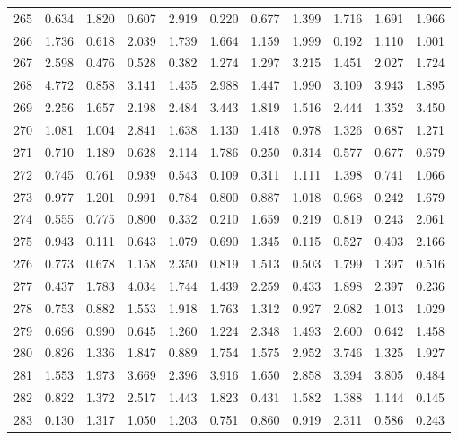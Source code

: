 \begin{tabular}{lrrrrrrrrrr}
265 &  0.634 &  1.820 &  0.607 &  2.919 &  0.220 &  0.677 &  1.399 &  1.716 &  1.691 &  1.966 \\
266 &  1.736 &  0.618 &  2.039 &  1.739 &  1.664 &  1.159 &  1.999 &  0.192 &  1.110 &  1.001 \\
267 &  2.598 &  0.476 &  0.528 &  0.382 &  1.274 &  1.297 &  3.215 &  1.451 &  2.027 &  1.724 \\
268 &  4.772 &  0.858 &  3.141 &  1.435 &  2.988 &  1.447 &  1.990 &  3.109 &  3.943 &  1.895 \\
269 &  2.256 &  1.657 &  2.198 &  2.484 &  3.443 &  1.819 &  1.516 &  2.444 &  1.352 &  3.450 \\
270 &  1.081 &  1.004 &  2.841 &  1.638 &  1.130 &  1.418 &  0.978 &  1.326 &  0.687 &  1.271 \\
271 &  0.710 &  1.189 &  0.628 &  2.114 &  1.786 &  0.250 &  0.314 &  0.577 &  0.677 &  0.679 \\
272 &  0.745 &  0.761 &  0.939 &  0.543 &  0.109 &  0.311 &  1.111 &  1.398 &  0.741 &  1.066 \\
273 &  0.977 &  1.201 &  0.991 &  0.784 &  0.800 &  0.887 &  1.018 &  0.968 &  0.242 &  1.679 \\
274 &  0.555 &  0.775 &  0.800 &  0.332 &  0.210 &  1.659 &  0.219 &  0.819 &  0.243 &  2.061 \\
275 &  0.943 &  0.111 &  0.643 &  1.079 &  0.690 &  1.345 &  0.115 &  0.527 &  0.403 &  2.166 \\
276 &  0.773 &  0.678 &  1.158 &  2.350 &  0.819 &  1.513 &  0.503 &  1.799 &  1.397 &  0.516 \\
277 &  0.437 &  1.783 &  4.034 &  1.744 &  1.439 &  2.259 &  0.433 &  1.898 &  2.397 &  0.236 \\
278 &  0.753 &  0.882 &  1.553 &  1.918 &  1.763 &  1.312 &  0.927 &  2.082 &  1.013 &  1.029 \\
279 &  0.696 &  0.990 &  0.645 &  1.260 &  1.224 &  2.348 &  1.493 &  2.600 &  0.642 &  1.458 \\
280 &  0.826 &  1.336 &  1.847 &  0.889 &  1.754 &  1.575 &  2.952 &  3.746 &  1.325 &  1.927 \\
281 &  1.553 &  1.973 &  3.669 &  2.396 &  3.916 &  1.650 &  2.858 &  3.394 &  3.805 &  0.484 \\
282 &  0.822 &  1.372 &  2.517 &  1.443 &  1.823 &  0.431 &  1.582 &  1.388 &  1.144 &  0.145 \\
283 &  0.130 &  1.317 &  1.050 &  1.203 &  0.751 &  0.860 &  0.919 &  2.311 &  0.586 &  0.243 \\

\end{tabular}
